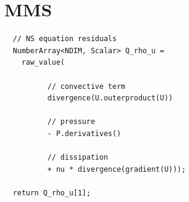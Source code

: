 \documentclass{article}
\begin{document}
\section{MMS}
\begin{verbatim}
  // NS equation residuals
  NumberArray<NDIM, Scalar> Q_rho_u = 
    raw_value(

	      // convective term
	      divergence(U.outerproduct(U))

	      // pressure
	      - P.derivatives()

	      // dissipation
	      + nu * divergence(gradient(U)));

  return Q_rho_u[1];
\end{verbatim}
\end{document}
